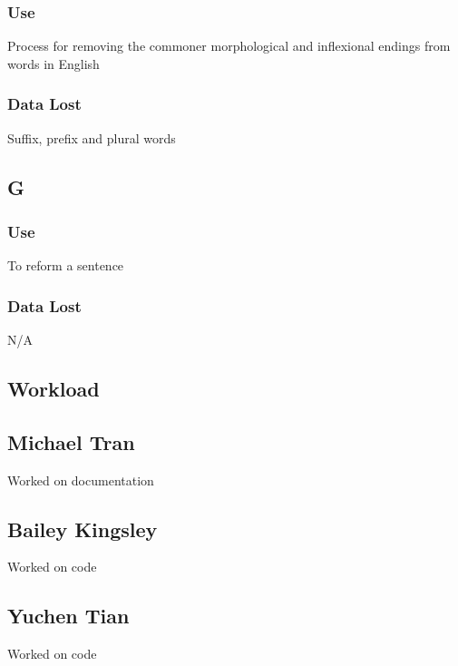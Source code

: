\documentclass{article}
\begin{document}
\subsubsection{Use}

Process for removing the commoner morphological and inflexional endings from words in English

\subsubsection{Data Lost}

Suffix, prefix and plural words 

\subsection{G}

\subsubsection{Use}

To reform a sentence

\subsubsection{Data Lost}

N/A

\begin{appendices}
	
	\section{Workload}
	\subsection{Michael Tran}
	Worked on documentation
	\subsection{Bailey Kingsley}
	Worked on code
	\subsection{Yuchen Tian}
	Worked on code	
	
\end{appendices}
\end{document}
